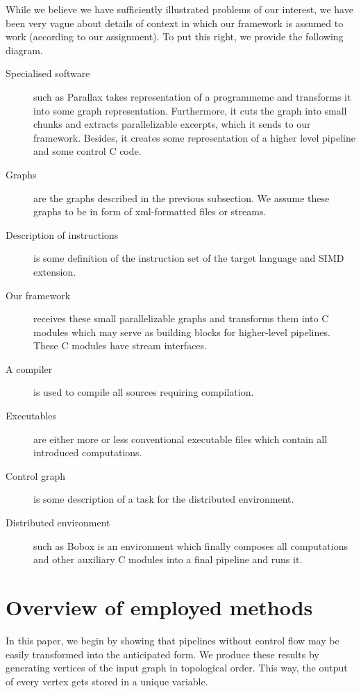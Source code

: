   While we believe we have sufficiently illustrated problems of our interest, we have been very vague about details of context in which our framework is assumed to work (according to our assignment). To put this right, we provide the following diagram.


\begin{description}
  \item[Specialised software] such as Parallax takes representation of a programmeme and transforms it into some graph representation. Furthermore, it cuts the graph into small chunks and extracts parallelizable excerpts, which it sends to our framework. Besides, it creates some representation of a higher level pipeline and some control C code.
  \item[Graphs] are the graphs described in the previous subsection. We assume these graphs to be in form of xml-formatted files or streams.
  \item[Description of instructions] is some definition of the instruction set of the target language and SIMD extension. 
  \item[Our framework] receives these small parallelizable graphs and transforms them into C modules which may serve as building blocks for higher-level pipelines. These C modules have stream interfaces.
  \item[A compiler] is used to compile all sources requiring compilation.
  \item[Executables] are either more or less conventional executable files which contain all introduced computations.
  \item[Control graph] is some description of a task for the distributed environment.
  \item[Distributed environment] such as Bobox \cite{bobox} is an environment which finally composes all computations and other auxiliary C modules into a final pipeline and runs it. 
\end{description}

\section{Overview of employed methods}

In this paper, we begin by showing that pipelines without control flow may be easily transformed into the anticipated form. We produce these results by generating vertices of the input graph in topological order. This way, the output of every vertex gets stored in a unique variable. 

